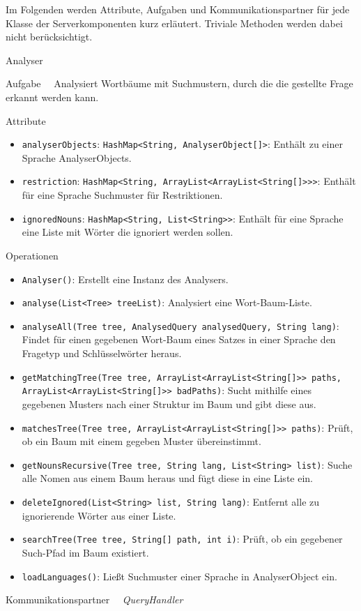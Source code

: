 Im Folgenden werden Attribute, Aufgaben und Kommunikationspartner für jede
Klasse der Serverkomponenten kurz erläutert. Triviale Methoden werden dabei
nicht berücksichtigt.

\begin{class}{50}{Analyser}
\item[Aufgabe]~\
Analysiert Wortbäume mit Suchmustern, durch die die gestellte Frage erkannt
werden kann.
\item[Attribute]~\
\begin{itemize}
\item \texttt{analyserObjects}: \texttt{HashMap<String, AnalyserObject[]>}:
Enthält zu einer Sprache AnalyserObjects.
\item \texttt{restriction}: \texttt{HashMap<String,
ArrayList<ArrayList<String[]>>>}: Enthält für eine Sprache Suchmuster für Restriktionen.
\item \texttt{ignoredNouns}: \texttt{HashMap<String, List<String>>}: Enthält
für eine Sprache eine Liste mit Wörter die ignoriert werden sollen.
\end{itemize}
\item[Operationen]~\
\begin{itemize}
\item \texttt{Analyser()}: Erstellt eine Instanz des Analysers.
\item \texttt{analyse(List<Tree> treeList)}: Analysiert eine Wort-Baum-Liste.
\item \texttt{analyseAll(Tree tree, AnalysedQuery analysedQuery, String lang)}:
Findet für einen gegebenen Wort-Baum eines Satzes in einer Sprache den Fragetyp und Schlüsselwörter heraus.
\item \texttt{getMatchingTree(Tree tree, ArrayList<ArrayList<String[]>> paths,
ArrayList<ArrayList<String[]>> badPaths)}: Sucht mithilfe eines gegebenen
Musters nach einer Struktur im Baum und gibt diese aus.
\item \texttt{matchesTree(Tree tree, ArrayList<ArrayList<String[]>> paths)}:
Prüft, ob ein Baum mit einem gegeben Muster übereinstimmt.
\item \texttt{getNounsRecursive(Tree tree, String lang, List<String> list)}:
Suche alle Nomen aus einem Baum heraus und fügt diese in eine Liste ein.
\item \texttt{deleteIgnored(List<String> list, String lang)}: Entfernt alle zu
ignorierende Wörter aus einer Liste.
\item \texttt{searchTree(Tree tree, String[] path, int i)}: Prüft, ob ein
gegebener Such-Pfad im Baum existiert.
\item \texttt{loadLanguages()}: Ließt Suchmuster einer Sprache in
AnalyserObject ein.
\end{itemize}
\item[Kommunikationspartner]~\
\textit{QueryHandler}
\end{class}


